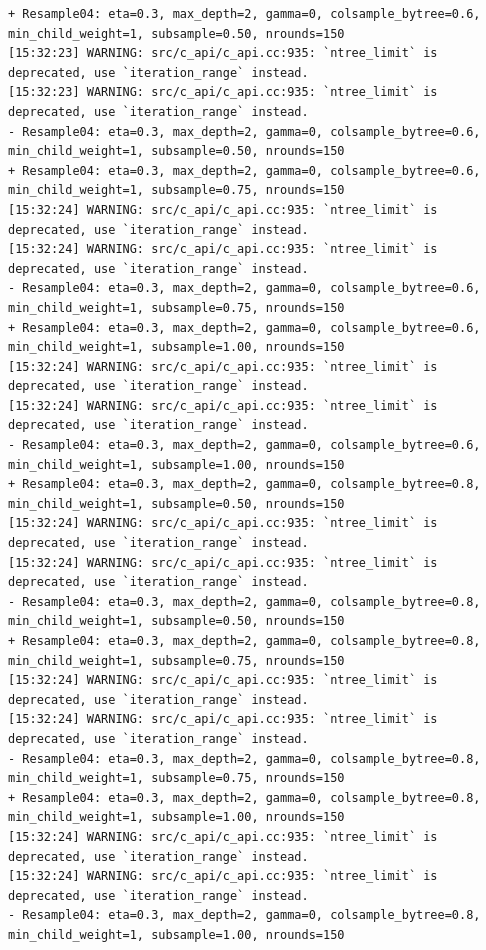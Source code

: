 \documentclass[
  letterpaper,
  DIV=11,
  numbers=noendperiod]{scrartcl}
\begin{document}
\begin{verbatim}
+ Resample04: eta=0.3, max_depth=2, gamma=0, colsample_bytree=0.6, min_child_weight=1, subsample=0.50, nrounds=150 
[15:32:23] WARNING: src/c_api/c_api.cc:935: `ntree_limit` is deprecated, use `iteration_range` instead.
[15:32:23] WARNING: src/c_api/c_api.cc:935: `ntree_limit` is deprecated, use `iteration_range` instead.
- Resample04: eta=0.3, max_depth=2, gamma=0, colsample_bytree=0.6, min_child_weight=1, subsample=0.50, nrounds=150 
+ Resample04: eta=0.3, max_depth=2, gamma=0, colsample_bytree=0.6, min_child_weight=1, subsample=0.75, nrounds=150 
[15:32:24] WARNING: src/c_api/c_api.cc:935: `ntree_limit` is deprecated, use `iteration_range` instead.
[15:32:24] WARNING: src/c_api/c_api.cc:935: `ntree_limit` is deprecated, use `iteration_range` instead.
- Resample04: eta=0.3, max_depth=2, gamma=0, colsample_bytree=0.6, min_child_weight=1, subsample=0.75, nrounds=150 
+ Resample04: eta=0.3, max_depth=2, gamma=0, colsample_bytree=0.6, min_child_weight=1, subsample=1.00, nrounds=150 
[15:32:24] WARNING: src/c_api/c_api.cc:935: `ntree_limit` is deprecated, use `iteration_range` instead.
[15:32:24] WARNING: src/c_api/c_api.cc:935: `ntree_limit` is deprecated, use `iteration_range` instead.
- Resample04: eta=0.3, max_depth=2, gamma=0, colsample_bytree=0.6, min_child_weight=1, subsample=1.00, nrounds=150 
+ Resample04: eta=0.3, max_depth=2, gamma=0, colsample_bytree=0.8, min_child_weight=1, subsample=0.50, nrounds=150 
[15:32:24] WARNING: src/c_api/c_api.cc:935: `ntree_limit` is deprecated, use `iteration_range` instead.
[15:32:24] WARNING: src/c_api/c_api.cc:935: `ntree_limit` is deprecated, use `iteration_range` instead.
- Resample04: eta=0.3, max_depth=2, gamma=0, colsample_bytree=0.8, min_child_weight=1, subsample=0.50, nrounds=150 
+ Resample04: eta=0.3, max_depth=2, gamma=0, colsample_bytree=0.8, min_child_weight=1, subsample=0.75, nrounds=150 
[15:32:24] WARNING: src/c_api/c_api.cc:935: `ntree_limit` is deprecated, use `iteration_range` instead.
[15:32:24] WARNING: src/c_api/c_api.cc:935: `ntree_limit` is deprecated, use `iteration_range` instead.
- Resample04: eta=0.3, max_depth=2, gamma=0, colsample_bytree=0.8, min_child_weight=1, subsample=0.75, nrounds=150 
+ Resample04: eta=0.3, max_depth=2, gamma=0, colsample_bytree=0.8, min_child_weight=1, subsample=1.00, nrounds=150 
[15:32:24] WARNING: src/c_api/c_api.cc:935: `ntree_limit` is deprecated, use `iteration_range` instead.
[15:32:24] WARNING: src/c_api/c_api.cc:935: `ntree_limit` is deprecated, use `iteration_range` instead.
- Resample04: eta=0.3, max_depth=2, gamma=0, colsample_bytree=0.8, min_child_weight=1, subsample=1.00, nrounds=150 

\end{verbatim}
\end{document}
